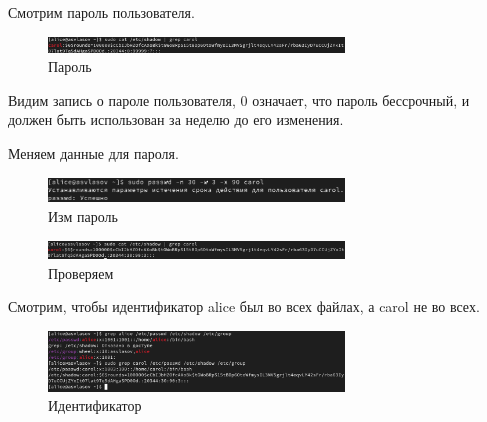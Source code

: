 \documentclass[
  12pt,
  a4paper,
  DIV=11,
  numbers=noendperiod]{scrreprt}
\begin{document}
Смотрим пароль пользователя.

\begin{figure}

{\centering \includegraphics[width=0.7\textwidth,height=\textheight]{image/12.png}

}

\caption{Пароль}

\end{figure}%

Видим запись о пароле пользователя, 0 означает, что пароль бессрочный, и
должен быть использован за неделю до его изменения.

Меняем данные для пароля.

\begin{figure}

{\centering \includegraphics[width=0.7\textwidth,height=\textheight]{image/13.png}

}

\caption{Изм пароль}

\end{figure}%
\begin{figure}

{\centering \includegraphics[width=0.7\textwidth,height=\textheight]{image/14.png}

}

\caption{Проверяем}

\end{figure}%

Смотрим, чтобы идентификатор alice был во всех файлах, а carol не во
всех.

\begin{figure}

{\centering \includegraphics[width=0.7\textwidth,height=\textheight]{image/15.png}

}

\caption{Идентификатор}

\end{figure}%
\end{document}
